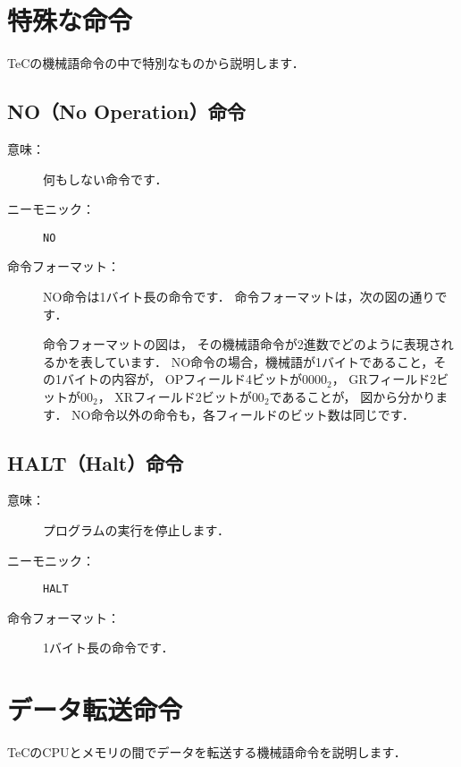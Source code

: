 \newpage
\section{特殊な命令}
TeCの機械語命令の中で特別なものから説明します．

\subsection{NO（No Operation）命令}
\begin{description}
\item[意味：]何もしない命令です．

\item[ニーモニック：]\texttt{NO}

\item[命令フォーマット：] NO命令は1バイト長の命令です．
  命令フォーマットは，次の図の通りです．


  命令フォーマットの図は，
  その機械語命令が2進数でどのように表現されるかを表しています．
  NO命令の場合，機械語が1バイトであること，その1バイトの内容が，
  OPフィールド4ビットが$0000_2$，
  GRフィールド2ビットが$00_2$，
  XRフィールド2ビットが$00_2$であることが，
  図から分かります．
  NO命令以外の命令も，各フィールドのビット数は同じです．
\end{description}

\subsection{HALT（Halt）命令}
\begin{description}
\item[意味：]プログラムの実行を停止します．

\item[ニーモニック：]\texttt{HALT}

\item[命令フォーマット：]1バイト長の命令です．


\end{description}

\newpage
\section{データ転送命令}
TeCのCPUとメモリの間でデータを転送する機械語命令を説明します．

